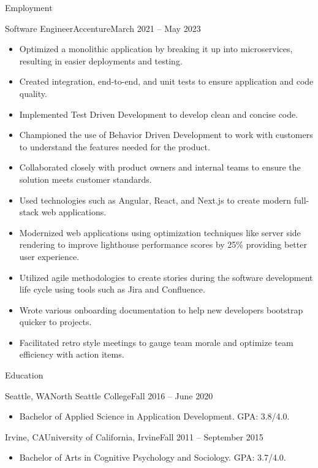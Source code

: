 \documentclass[]{mcdowellcv}
\begin{document}
\begin{cvsection}{Employment}
		\begin{cvsubsection}{Software Engineer}{Accenture}{March 2021 -- May 2023}	
			\begin{itemize}
				\item Optimized a monolithic application by breaking it up into microservices, resulting in easier deployments and testing.
				\item Created integration, end-to-end, and unit tests to ensure application and code quality.
				\item Implemented Test Driven Development to develop clean and concise code.
				\item Championed the use of Behavior Driven Development to work with customers to understand the features needed for the product.
				\item Collaborated closely with product owners and internal teams to ensure the solution meets customer standards.
				\item Used technologies such as Angular, React, and Next.js to create modern full-stack web applications.
				\item Modernized web applications using optimization techniques like server side rendering to improve lighthouse performance scores by 25\% providing better user experience.
				\item Utilized agile methodologies to create stories during the software development life cycle using tools such as Jira and Confluence.
				\item Wrote various onboarding documentation to help new developers bootstrap quicker to projects.
				\item Facilitated retro style meetings to gauge team morale and optimize team efficiency with action items. 
			\end{itemize}
		\end{cvsubsection}
	\end{cvsection}
	
	\begin{cvsection}{Education}
		\begin{cvsubsection}{Seattle, WA}{North Seattle College}{Fall 2016 -- June 2020}
			\begin{itemize}
				\item Bachelor of Applied Science in Application Development. GPA: 3.8/4.0.
			\end{itemize}
		\end{cvsubsection}
		\begin{cvsubsection}{Irvine, CA}{University of California, Irvine}{Fall 2011 -- September 2015}
			\begin{itemize}
				\item Bachelor of Arts in Cognitive Psychology and Sociology. GPA: 3.7/4.0.
			\end{itemize}
		\end{cvsubsection}
	\end{cvsection}
	
\end{document}
